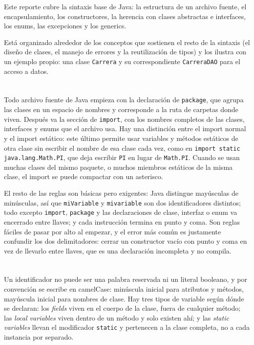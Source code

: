 \documentclass[10pt,a4paper]{article}
\begin{document}
Este reporte cubre la sintaxis base de Java: la estructura de un archivo fuente, el encapsulamiento, los constructores, la herencia con clases abstractas e interfaces, los enums, las excepciones y los generics.

Está organizado alrededor de los conceptos que sostienen el resto de la sintaxis (el diseño de clases, el manejo de errores y la reutilización de tipos) y los ilustra con un ejemplo propio: una clase \texttt{Carrera} y su correspondiente \texttt{CarreraDAO} para el acceso a datos.

\section{\color{colorIPN}{Estructura de un archivo Java}}

Todo archivo fuente de Java empieza con la declaración de \texttt{package}, que agrupa las clases en un espacio de nombres y corresponde a la ruta de carpetas donde viven. Después va la sección de \texttt{import}, con los nombres completos de las clases, interfaces y enums que el archivo usa. Hay una distinción entre el import normal y el import estático: este último permite usar variables y métodos estáticos de otra clase sin escribir el nombre de esa clase cada vez, como en \texttt{import static java.lang.Math.PI}, que deja escribir \texttt{PI} en lugar de \texttt{Math.PI}. Cuando se usan muchas clases del mismo paquete, o muchos miembros estáticos de la misma clase, el import se puede compactar con un asterisco.

El resto de las reglas son básicas pero exigentes: Java distingue mayúsculas de minúsculas, así que \texttt{miVariable} y \texttt{mivariable} son dos identificadores distintos; todo excepto \texttt{import}, \texttt{package} y las declaraciones de clase, interfaz o enum va encerrado entre llaves; y cada instrucción termina en punto y coma. Son reglas fáciles de pasar por alto al empezar, y el error más común es justamente confundir los dos delimitadores: cerrar un constructor vacío con punto y coma en vez de llevarlo entre llaves, que es una declaración incompleta y no compila.

\section{\color{colorIPN}{Identificadores y tipos de variable}}

Un identificador no puede ser una palabra reservada ni un literal booleano, y por convención se escribe en camelCase: minúscula inicial para atributos y métodos, mayúscula inicial para nombres de clase. Hay tres tipos de variable según dónde se declaran: los \textit{fields} viven en el cuerpo de la clase, fuera de cualquier método; las \textit{local variables} viven dentro de un método y solo existen ahí; y las \textit{static variables} llevan el modificador \texttt{static} y pertenecen a la clase completa, no a cada instancia por separado.
\end{document}
